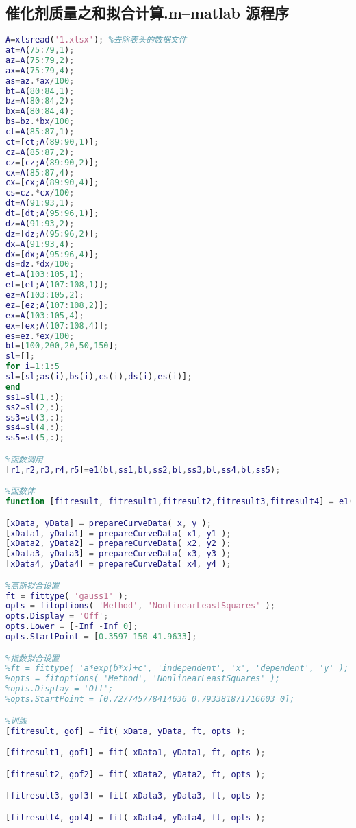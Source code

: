 \documentclass[withoutpreface,bwprint]{cumcmthesis} %
\begin{document}
\begin{appendices}
\section{催化剂质量之和拟合计算.m--matlab 源程序}
\begin{lstlisting}[language=matlab]
%质量之和拟合
A=xlsread('1.xlsx'); %去除表头的数据文件
at=A(75:79,1);
az=A(75:79,2);
ax=A(75:79,4);
as=az.*ax/100;
bt=A(80:84,1);
bz=A(80:84,2);
bx=A(80:84,4);
bs=bz.*bx/100;
ct=A(85:87,1);
ct=[ct;A(89:90,1)];
cz=A(85:87,2);
cz=[cz;A(89:90,2)];
cx=A(85:87,4);
cx=[cx;A(89:90,4)];
cs=cz.*cx/100;
dt=A(91:93,1);
dt=[dt;A(95:96,1)];
dz=A(91:93,2);
dz=[dz;A(95:96,2)];
dx=A(91:93,4);
dx=[dx;A(95:96,4)];
ds=dz.*dx/100;
et=A(103:105,1);
et=[et;A(107:108,1)];
ez=A(103:105,2);
ez=[ez;A(107:108,2)];
ex=A(103:105,4);
ex=[ex;A(107:108,4)];
es=ez.*ex/100;
bl=[100,200,20,50,150];
sl=[];
for i=1:1:5
sl=[sl;as(i),bs(i),cs(i),ds(i),es(i)];  
end
ss1=sl(1,:);
ss2=sl(2,:);
ss3=sl(3,:);
ss4=sl(4,:);
ss5=sl(5,:);

%函数调用
[r1,r2,r3,r4,r5]=e1(bl,ss1,bl,ss2,bl,ss3,bl,ss4,bl,ss5);

%函数体
function [fitresult, fitresult1,fitresult2,fitresult3,fitresult4] = e1( x, y, x1, y1, x2, y2, x3, y3, x4, y4) 

[xData, yData] = prepareCurveData( x, y );
[xData1, yData1] = prepareCurveData( x1, y1 );
[xData2, yData2] = prepareCurveData( x2, y2 );
[xData3, yData3] = prepareCurveData( x3, y3 );
[xData4, yData4] = prepareCurveData( x4, y4 );

%高斯拟合设置
ft = fittype( 'gauss1' );
opts = fitoptions( 'Method', 'NonlinearLeastSquares' );
opts.Display = 'Off';
opts.Lower = [-Inf -Inf 0];
opts.StartPoint = [0.3597 150 41.9633];

%指数拟合设置
%ft = fittype( 'a*exp(b*x)+c', 'independent', 'x', 'dependent', 'y' );
%opts = fitoptions( 'Method', 'NonlinearLeastSquares' );
%opts.Display = 'Off';
%opts.StartPoint = [0.727745778414636 0.793381871716603 0];

%训练
[fitresult, gof] = fit( xData, yData, ft, opts );

[fitresult1, gof1] = fit( xData1, yData1, ft, opts );

[fitresult2, gof2] = fit( xData2, yData2, ft, opts );

[fitresult3, gof3] = fit( xData3, yData3, ft, opts );

[fitresult4, gof4] = fit( xData4, yData4, ft, opts );


\end{lstlisting}
\end{appendices}
\end{document}
